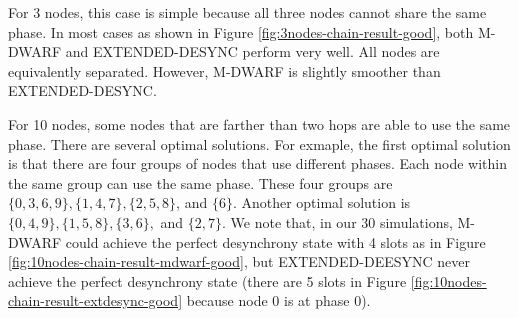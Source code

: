 For 3 nodes, this case is simple because all three nodes cannot share  the same phase.
In most cases as shown in Figure \ref{fig:3nodes-chain-result-good}, both M-DWARF and EXTENDED-DESYNC perform very well. All nodes are equivalently separated. However, M-DWARF is slightly smoother than EXTENDED-DESYNC. 

For 10 nodes, some nodes that are farther than two hops are able to use the same phase. There are several optimal solutions. For exmaple, the first optimal solution is that there are four groups of nodes that use different phases. Each node within the same group can use the same phase. These four groups are $\lbrace 0, 3, 6, 9 \rbrace , \lbrace 1, 4, 7 \rbrace, \lbrace 2, 5, 8 \rbrace$, and $\lbrace 6 \rbrace$. Another optimal solution is $\lbrace 0, 4, 9 \rbrace, \lbrace 1, 5, 8 \rbrace, \lbrace 3, 6 \rbrace,$ and $\lbrace 2, 7 \rbrace$.
We note that, in our 30 simulations, M-DWARF could achieve the perfect desynchrony state with 4 slots as in Figure \ref{fig:10nodes-chain-result-mdwarf-good}, but EXTENDED-DEESYNC never achieve the perfect desynchrony state (there are 5 slots in Figure \ref{fig:10nodes-chain-result-extdesync-good} because node 0 is at phase 0).


